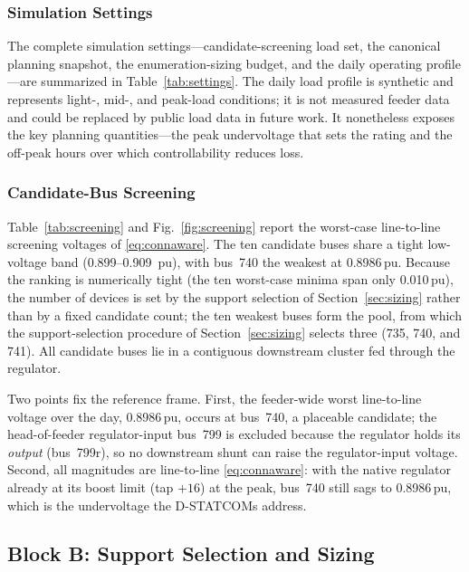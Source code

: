 \documentclass{ieeeaccess}
\newcommand{\SI}[2]{#1\,\ensuremath{\mathrm{#2}}}
\newcommand{\numrange}[2]{#1\mbox{--}#2}
\begin{document}
\subsubsection{Simulation Settings}
The complete simulation settings---candidate-screening load set, the canonical
planning snapshot, the enumeration-sizing budget, and the daily operating
profile---are summarized in
Table~\ref{tab:settings}. The daily load profile is synthetic and represents
light-, mid-, and peak-load conditions; it is not measured feeder data and could
be replaced by public load data in future work. It nonetheless exposes the key
planning quantities---the peak undervoltage that sets the rating and the
off-peak hours over which controllability reduces loss.

\subsubsection{Candidate-Bus Screening}
Table~\ref{tab:screening} and Fig.~\ref{fig:screening} report the worst-case
line-to-line screening voltages of \eqref{eq:connaware}. The ten candidate buses
share a tight low-voltage band (\numrange{0.899}{0.909}~pu), with bus~740 the
weakest at \SI{0.8986}{pu}. Because the ranking is numerically tight (the ten
worst-case minima span only \SI{0.010}{pu}), the number of devices is set by the support selection of
Section~\ref{sec:sizing} rather than by a fixed candidate count; the ten weakest
buses form the pool, from which the support-selection procedure of
Section~\ref{sec:sizing} selects three (735, 740, and 741). All candidate buses
lie in a contiguous downstream cluster fed through the regulator.

Two points fix the reference frame. First, the feeder-wide worst line-to-line
voltage over the day, \SI{0.8986}{pu}, occurs at bus~740, a placeable candidate;
the head-of-feeder regulator-input bus~799 is excluded because the regulator holds
its \emph{output} (bus~799r), so no downstream shunt can raise the regulator-input
voltage. Second, all magnitudes are line-to-line \eqref{eq:connaware}: with the
native regulator already at its boost limit (tap $+16$) at the peak, bus~740 still
sags to \SI{0.8986}{pu}, which is the undervoltage the D-STATCOMs address.

\subsection{Block B: Support Selection and Sizing}
\label{sec:blockB}
\end{document}
